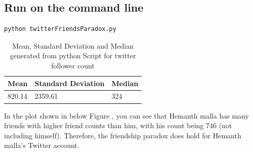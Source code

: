 \documentclass[letterpaper,11pt]{article}
\begin{document}
\subsection*{Run on the command line}
\begin{lstlisting}[frame=single]
python twitterFriendsParadox.py
\end{lstlisting}

\clearpage
\begin{table}[htb]
\centering
\begin{tabular}{ | l | l | l |}
\hline
\textbf{Mean} & \textbf{Standard Deviation} & \textbf{Median} \\
\hline
820.14 & 2359.61 & 324 \\
\hline
\end{tabular}
\caption{Mean, Standard Deviation and Median generated from python Script for twitter follower count}
\label{table:q2summary}
\end{table}
In the plot shown in below  Figure , you can see that Hemanth malla has many friends with higher friend counts than him, with his count being 746 (not including himself). Therefore, the friendship paradox does hold for Hemanth malla's Twitter account.
\end{document}
